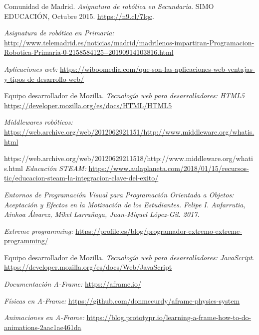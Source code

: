 \begin{thebibliography}{99}

    Comunidad de Madrid. %
    \textit{Asignatura de robótica en Secundaria.} %
    SIMO EDUCACIÓN, Octubre 2015. %
    \url{https://n9.cl/7lqc}. %

    \textit{Asignatura de robótica en Primaria:}
    \url{http://www.telemadrid.es/noticias/madrid/madrilenos-impartiran-Programacion-Robotica-Primaria-0-2158584125--20190914103816.html}

    \textit{Aplicaciones web:} 
    \url{https://wiboomedia.com/que-son-las-aplicaciones-web-ventajas-y-tipos-de-desarrollo-web/}
    
    Equipo desarrollador de Mozilla.
    \textit{Tecnología web para desarrolladores: HTML5}   \url{https://developer.mozilla.org/es/docs/HTML/HTML5}
     
    \textit{Middlewares robóticos:}   \url{https://web.archive.org/web/2012062921151/http://www.middleware.org/whatis.html}
    
    https://web.archive.org/web/20120629211518/http://www.middleware.org/whatis.html
    \textit{Educación STEAM:}   \url{https://www.aulaplaneta.com/2018/01/15/recursos-tic/educacion-steam-la-integracion-clave-del-exito/}
    
    \textit{Entornos de Programación Visual para Programación Orientada a Objetos: Aceptación y Efectos en la Motivación de los Estudiantes. Felipe I. Anfarrutia, Ainhoa Álvarez, Mikel Larrañaga, Juan-Miguel López-Gil. 2017.}
    
    \textit{Extreme programming: }
    \url{https://profile.es/blog/programador-extremo-extreme-programming/}
  
    Equipo desarrollador de Mozilla.
    \textit{Tecnología web para desarrolladores: JavaScript}.
    \url{https://developer.mozilla.org/es/docs/Web/JavaScript}

    \textit{Documentación A-Frame:}
    \url{https://aframe.io/}
    
    \textit{Físicas en A-Frame: }
    \url{https://github.com/donmccurdy/aframe-physics-system}
    
    \textit{Animaciones en A-Frame: }
    \url{https://blog.prototypr.io/learning-a-frame-how-to-do-animations-2aac1ae461da}
    

\end{thebibliography}
